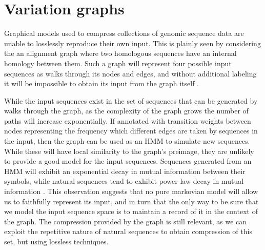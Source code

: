 
\chapter{Variation graphs}

\ifpdf
    \graphicspath{{Chapter2/Figs/Raster/}{Chapter2/Figs/PDF/}{Chapter2/Figs/}}
\else
    \graphicspath{{Chapter2/Figs/Vector/}{Chapter2/Figs/}}
\fi

Graphical models used to compress collections of genomic sequence data are unable to losslessly reproduce their own input.
This is plainly seen by considering the an alignment graph where two homologous sequences have an internal homology between them.
Such a graph will represent four possible input sequences as walks through its nodes and edges, and without additional labeling it will be impossible to obtain its input from the graph itself \cite{kehr2014genome}.

While the input sequences exist in the set of sequences that can be generated by walks through the graph, as the complexity of the graph grows the number of paths will increase exponentially.
If annotated with transition weights between nodes representing the frequency which different edges are taken by sequences in the input, then the graph can be used as an HMM to simulate new sequences.
While these will have local similarity to the graph's preimage, they are unlikely to provide a good model for the input sequences.
Sequences generated from an HMM will exhibit an exponential decay in mutual information between their symbols, while natural sequences tend to exhibit power-law decay in mutual information \cite{lin2017critical}.
This observation suggests that no pure markovian model will allow us to faithfully represent its input, and in turn that the only way to be sure that we model the input sequence space is to maintain a record of it in the context of the graph.
The compression provided by the graph is still relevant, as we can exploit the repetitive nature of natural sequences to obtain compression of this set, but using lossless techniques.

